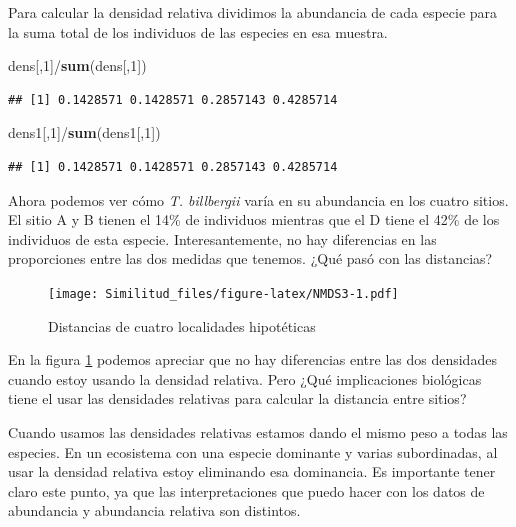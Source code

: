 \documentclass[]{book}
\newenvironment{Shaded}{\begin{snugshade}}{\end{snugshade}}
\newcommand{\KeywordTok}[1]{\textcolor[rgb]{0.13,0.29,0.53}{\textbf{{#1}}}}
\newcommand{\DecValTok}[1]{\textcolor[rgb]{0.00,0.00,0.81}{{#1}}}
\newcommand{\NormalTok}[1]{{#1}}
\begin{document}
Para calcular la densidad relativa dividimos la abundancia de cada
especie para la suma total de los individuos de las especies en esa
muestra.

\begin{Shaded}
\begin{Highlighting}[]
\NormalTok{dens[,}\DecValTok{1}\NormalTok{]/}\KeywordTok{sum}\NormalTok{(dens[,}\DecValTok{1}\NormalTok{])}
\end{Highlighting}
\end{Shaded}

\begin{verbatim}
## [1] 0.1428571 0.1428571 0.2857143 0.4285714
\end{verbatim}

\begin{Shaded}
\begin{Highlighting}[]
\NormalTok{dens1[,}\DecValTok{1}\NormalTok{]/}\KeywordTok{sum}\NormalTok{(dens1[,}\DecValTok{1}\NormalTok{])}
\end{Highlighting}
\end{Shaded}

\begin{verbatim}
## [1] 0.1428571 0.1428571 0.2857143 0.4285714
\end{verbatim}

Ahora podemos ver cómo \emph{T. billbergii} varía en su abundancia en
los cuatro sitios. El sitio A y B tienen el 14\% de individuos mientras
que el D tiene el 42\% de los individuos de esta especie.
Interesantemente, no hay diferencias en las proporciones entre las dos
medidas que tenemos. ¿Qué pasó con las distancias?

\begin{figure}[htbp]
\centering
\texttt{[image: Similitud\_files/figure-latex/NMDS3-1.pdf]}
\caption{\label{fig:NMDS3}Distancias de cuatro localidades hipotéticas}
\end{figure}

En la figura \ref{fig:NMDS3} podemos apreciar que no hay diferencias
entre las dos densidades cuando estoy usando la densidad relativa. Pero
¿Qué implicaciones biológicas tiene el usar las densidades relativas
para calcular la distancia entre sitios?

Cuando usamos las densidades relativas estamos dando el mismo peso a
todas las especies. En un ecosistema con una especie dominante y varias
subordinadas, al usar la densidad relativa estoy eliminando esa
dominancia. Es importante tener claro este punto, ya que las
interpretaciones que puedo hacer con los datos de abundancia y
abundancia relativa son distintos.
\end{document}
